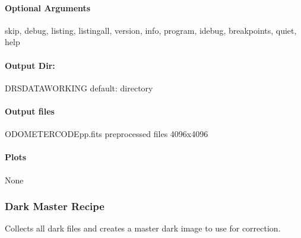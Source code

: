 \documentclass[a4paper,10pt,english]{report}
\begin{document}
\paragraph{Optional Arguments}
\label{\detokenize{user/spirou/recipes/preprocessing:optional-arguments}}
\begin{sphinxVerbatim}[commandchars=\\\{\}]
\PYGZhy{}\PYGZhy{}skip, \PYGZhy{}\PYGZhy{}debug, \PYGZhy{}\PYGZhy{}listing, \PYGZhy{}\PYGZhy{}listingall, \PYGZhy{}\PYGZhy{}version, \PYGZhy{}\PYGZhy{}info,
\PYGZhy{}\PYGZhy{}program, \PYGZhy{}\PYGZhy{}idebug, \PYGZhy{}\PYGZhy{}breakpoints, \PYGZhy{}\PYGZhy{}quiet, \PYGZhy{}\PYGZhy{}help
\end{sphinxVerbatim}


\paragraph{Output Dir:}
\label{\detokenize{user/spirou/recipes/preprocessing:output-dir}}
\begin{sphinxVerbatim}[commandchars=\\\{\}]
DRS\PYGZus{}DATA\PYGZus{}WORKING    default:  directory
\end{sphinxVerbatim}


\paragraph{Output files}
\label{\detokenize{user/spirou/recipes/preprocessing:output-files}}
\begin{sphinxVerbatim}[commandchars=\\\{\}]
ODOMETER\PYGZus{}CODE\PYGZus{}pp.fits   preprocessed files 4096x4096
\end{sphinxVerbatim}


\paragraph{Plots}
\label{\detokenize{user/spirou/recipes/preprocessing:plots}}
\begin{sphinxVerbatim}[commandchars=\\\{\}]
None
\end{sphinxVerbatim}


\subsubsection{Dark Master Recipe}
\label{\detokenize{user/spirou/recipes/dark_master:dark-master-recipe}}\label{\detokenize{user/spirou/recipes/dark_master:recipes-spirou-dark-master}}\label{\detokenize{user/spirou/recipes/dark_master::doc}}
Collects all dark files and creates a master dark image to use for correction.
\end{document}
